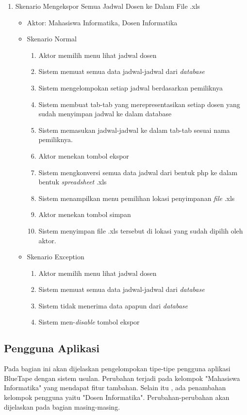\begin{enumerate}
	\item Skenario Mengekspor Semua Jadwal Dosen ke Dalam File .xls
	\begin{itemize}
		\item Aktor: Mahasiswa Informatika, Dosen Informatika
		\item Skenario Normal
			\begin{enumerate}[1.]
				\item Aktor memilih menu lihat jadwal dosen
				\item Sistem memuat semua data jadwal-jadwal dari \textit{database}
				\item Sistem mengelompokan setiap jadwal berdasarkan pemiliknya
				\item Sistem membuat tab-tab yang merepresentasikan setiap dosen yang sudah menyimpan jadwal ke dalam database
				\item Sistem memasukan jadwal-jadwal ke dalam tab-tab sesuai nama pemiliknya.
				\item Aktor menekan tombol ekspor
				\item Sistem mengkonversi semua data jadwal dari bentuk php ke dalam bentuk \textit{spreadsheet} .xls
				\item Sistem menampilkan menu pemilihan lokasi penyimpanan \textit{file} .xls
				\item Aktor menekan tombol simpan
				\item Sistem menyimpan file .xls tersebut di lokasi yang sudah dipilih oleh aktor.
			\end{enumerate}
		\item Skenario Exception
			\begin{enumerate}[1.]
				\item Aktor memilih menu lihat jadwal dosen
				\item Sistem memuat semua data jadwal-jadwal dari \textit{database}
				\item Sistem tidak menerima data apapun dari \textit{database}
				\item Sistem men-\textit{disable} tombol ekspor
			\end{enumerate}
	\end{itemize}
\end{enumerate}

\subsection{Pengguna Aplikasi}
Pada bagian ini akan dijelaskan pengelompokan tipe-tipe pengguna aplikasi BlueTape dengan sistem usulan. Perubahan terjadi pada kelompok "Mahasiswa Informatika" yang mendapat fitur tambahan. Selain itu , ada penambahan kelompok pengguna yaitu "Dosen Informatika". Perubahan-perubahan akan dijelaskan pada bagian masing-masing.


